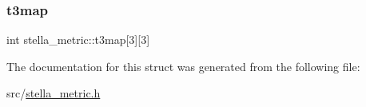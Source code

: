 \mbox{\label{structstella__metric_ae94574eec95ae62749a189dc8badd663}} 
\subsubsection{\texorpdfstring{t3map}{t3map}}
{\footnotesize\ttfamily int stella\+\_\+metric\+::t3map\mbox{[}3\mbox{]}\mbox{[}3\mbox{]}}



The documentation for this struct was generated from the following file\+:\begin{DoxyCompactItemize}
\item 
src/\mbox{\hyperlink{stella__metric_8h}{stella\+\_\+metric.\+h}}\end{DoxyCompactItemize}
